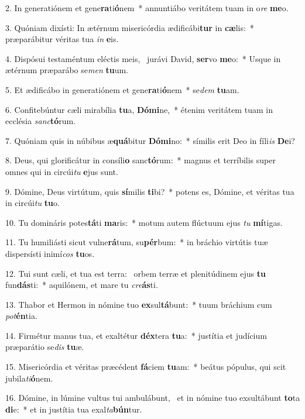 2. In generatiónem et gene\textbf{ra}ti\textbf{ó}nem~*  annuntiábo veritátem tuam in o\textit{re} \textbf{me}o.\

3. Quóniam dixísti: In ætérnum misericórdia ædificábi\textbf{tur} in \textbf{cæ}lis:~*  præparábitur véritas tua \textit{in} \textbf{e}is.\

4. Dispósui testaméntum eléctis meis, \dag\  jurávi David, \textbf{ser}vo \textbf{me}o:~*  Usque in ætérnum præparábo se\textit{men} \textbf{tu}um.\

5. Et ædificábo in generatiónem et gene\textbf{ra}ti\textbf{ó}nem~*  se\textit{dem} \textbf{tu}am.\

6. Confitebúntur cæli mirabília \textbf{tu}a, \textbf{Dó}\textbf{mi}ne,~*  étenim veritátem tuam in ecclésia \textit{sanc}\textbf{tó}rum.\

7. Quóniam quis in núbibus æ\textbf{quá}bitur \textbf{Dó}\textbf{mi}no:~*  símilis erit Deo in fíli\textit{is} \textbf{De}i?\

8. Deus, qui glorificátur in consíli\textbf{o} sanc\textbf{tó}rum:~*  magnus et terríbilis super omnes qui in circúi\textit{tu} \textbf{e}jus sunt.\

9. Dómine, Deus virtútum, quis \textbf{sí}milis \textbf{ti}bi?~*  potens es, Dómine, et véritas tua in circúi\textit{tu} \textbf{tu}o.\

10. Tu domináris potes\textbf{tá}ti \textbf{ma}ris:~*  motum autem flúctuum ejus \textit{tu} \textbf{mí}tigas.\

11. Tu humiliásti sicut vulne\textbf{rá}tum, su\textbf{pér}bum:~*  in bráchio virtútis tuæ dispersísti inimí\textit{cos} \textbf{tu}os.\

12. Tui sunt cæli, et tua est terra: \dag\  orbem terræ et plenitúdinem ejus \textbf{tu} fun\textbf{dás}ti:~*  aquilónem, et mare tu \textit{cre}\textbf{ás}ti.\

13. Thabor et Hermon in nómine tuo \textbf{ex}sul\textbf{tá}bunt:~*  tuum bráchium cum \textit{pot}\textbf{én}tia.\

14. Firmétur manus tua, et exaltétur \textbf{déx}tera \textbf{tu}a:~*  justítia et judícium præparátio se\textit{dis} \textbf{tu}æ.\

15. Misericórdia et véritas præcédent \textbf{fá}ciem \textbf{tu}am:~*  beátus pópulus, qui scit jubila\textit{ti}\textbf{ó}nem.\

16. Dómine, in lúmine vultus tui ambulábunt, \dag\  et in nómine tuo exsultábunt \textbf{to}ta \textbf{di}e:~*  et in justítia tua exal\textit{ta}\textbf{bún}tur.\

